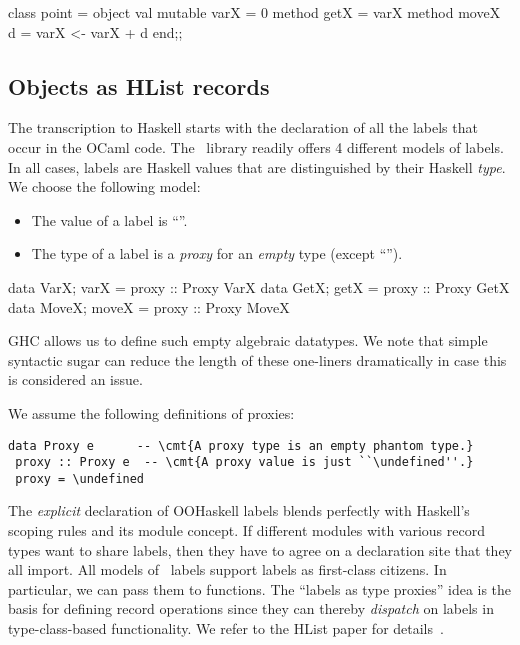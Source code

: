 \begin{code}
 class point =
   object
     val mutable varX = 0
     method getX      = varX
     method moveX d   = varX <- varX + d
   end;;
\end{code}




\medskip

\subsection{Objects as HList records}

The transcription to Haskell starts with the declaration of all the
labels that occur in the OCaml code. The \HList\ library readily
offers 4 different models of labels. In all cases, labels are Haskell
values that are distinguished by their Haskell \emph{type}. We choose
the following model:
%
\begin{itemize}
\item The value of a label is ``\undefined''.
\item The type of a label is a \emph{proxy} for an \emph{empty} type (except ``\undefined'').
\end{itemize}

\medskip

\begin{code}
 data VarX;  varX  = proxy :: Proxy VarX 
 data GetX;  getX  = proxy :: Proxy GetX
 data MoveX; moveX = proxy :: Proxy MoveX
\end{code}

GHC allows us to define such empty algebraic datatypes. We note that
simple syntactic sugar can reduce the length of these one-liners
dramatically in case this is considered an issue.

We assume the following definitions of proxies:

\begin{Verbatim}[fontsize=\small,commandchars=\\\{\}]
 data Proxy e      -- \cmt{A proxy type is an empty phantom type.}
 proxy :: Proxy e  -- \cmt{A proxy value is just ``\undefined''.}
 proxy = \undefined
\end{Verbatim}

The \emph{explicit} declaration of OOHaskell labels blends perfectly
with Haskell's scoping rules and its module concept. If different
modules with various record types want to share labels, then they have
to agree on a declaration site that they all import. All models of
\HList\ labels support labels as first-class citizens. In particular,
we can pass them to functions. The ``labels as type proxies'' idea is
the basis for defining record operations since they can thereby
\emph{dispatch} on labels in type-class-based functionality. We refer
to the HList paper for details~\cite{HLIST-HW04}.

